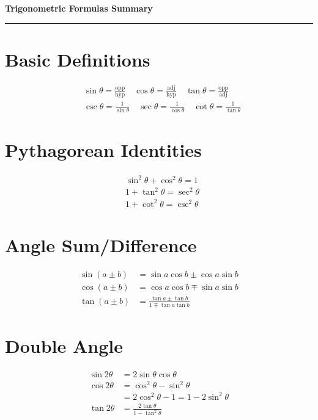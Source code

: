 \documentclass[fleqn, a4paper,10pt]{article}
\begin{document}
\begin{center}
    {\LARGE \textbf{Trigonometric Formulas Summary}} \\
    \rule{\linewidth}{0.4pt}
\end{center}

\begin{multicols}{2}
\small

\section*{Basic Definitions}
\[
\begin{aligned}
&\sin \theta = \frac{\text{opp}}{\text{hyp}} \quad
\cos \theta = \frac{\text{adj}}{\text{hyp}} \quad
\tan \theta = \frac{\text{opp}}{\text{adj}} \\
&\csc \theta = \frac{1}{\sin \theta} \quad
\sec \theta = \frac{1}{\cos \theta} \quad
\cot \theta = \frac{1}{\tan \theta}
\end{aligned}
\]

\section*{Pythagorean Identities}
\[
\begin{aligned}
&\sin^2\theta + \cos^2\theta = 1 \\
&1 + \tan^2\theta = \sec^2\theta \\
&1 + \cot^2\theta = \csc^2\theta
\end{aligned}
\]

\section*{Angle Sum/Difference}
\[
\begin{aligned}
\sin(a \pm b) &= \sin a \cos b \pm \cos a \sin b \\
\cos(a \pm b) &= \cos a \cos b \mp \sin a \sin b \\
\tan(a \pm b) &= \frac{\tan a \pm \tan b}{1 \mp \tan a \tan b}
\end{aligned}
\]

\section*{Double Angle}
\[
\begin{aligned}
\sin 2\theta &= 2\sin\theta\cos\theta \\
\cos 2\theta &= \cos^2\theta - \sin^2\theta \\
&= 2\cos^2\theta - 1 = 1 - 2\sin^2\theta \\
\tan 2\theta &= \frac{2\tan\theta}{1 - \tan^2\theta}
\end{aligned}
\]


\end{multicols}
\end{document}

